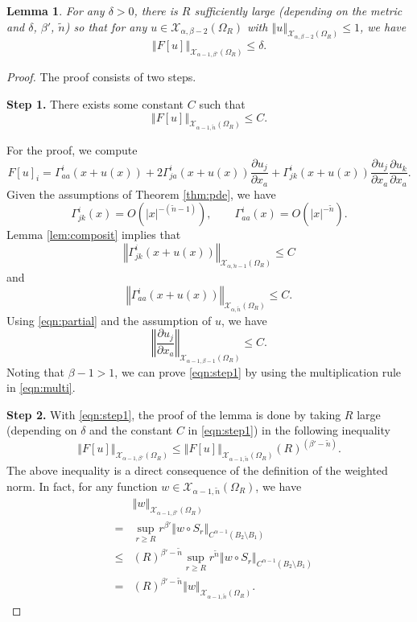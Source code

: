 \documentclass{amsart}
\newtheorem{lem}[thm]{Lemma}
\newcommand{\norm}[1]{\left\Vert#1\right\Vert}
\newcommand{\abs}[1]{\left\vert#1\right\vert}
\newcommand{\pfrac}[2]{\frac{\partial #1}{\partial #2}}
\numberwithin{equation}{section}
\begin{document}
\begin{lem}\label{lem:Fu}
	For any $\delta>0$, there is $R$ sufficiently large (depending on the metric and $\delta$, $\beta'$, $\tilde{n}$) so that for any $u\in \mathcal X_{\alpha,\beta-2}(\Omega_R)$ with $\norm{u}_{\mathcal X_{\alpha,\beta-2}(\Omega_R)}\leq 1$, we have
	\[
		\norm{F[u]}_{\mathcal X_{\alpha-1,\beta'}(\Omega_{R})}\leq \delta.
	\]
\end{lem}
\begin{proof}
	The proof consists of two steps.


	{\bf Step 1.}
	There exists some constant $C$ such that
	\begin{equation}
		\label{eqn:step1}
		\norm{F[u]}_{\mathcal X_{\alpha-1,\tilde{n}}(\Omega_{R})}\leq C.
	\end{equation}

	For the proof, we compute
	\[
		F[u]_i = \Gamma^i_{aa}(x+u(x)) + 2 \Gamma^i_{ja}(x+u(x)) \pfrac{u_j}{x_a}  + \Gamma^i_{jk}(x+u(x)) \pfrac{u_j}{x_a} \pfrac{u_k}{x_a}.
	\]
	Given the assumptions of Theorem \ref{thm:pde}, we have
	\[
		\Gamma^i_{jk}(x) = O(\abs{x}^{-(\tilde{n}-1)}), \qquad \Gamma^i_{aa}(x) = O(\abs{x}^{-\tilde{n}}).
	\]
	Lemma \ref{lem:composit} implies that
	\[
		\norm{\Gamma^i_{jk}(x+u(x)) }_{\mathcal X_{\alpha,\tilde{n}-1}(\Omega_R)}\leq C
	\]
	and
	\[
		\norm{\Gamma^i_{aa}(x+u(x))}_{\mathcal X_{\alpha,\tilde{n}}(\Omega_R)}\leq C.
	\]
	Using \eqref{eqn:partial} and the assumption of $u$, we have
	\[
		\norm{\pfrac{u_j}{x_a}}_{\mathcal X_{\alpha-1,\beta-1}(\Omega_R)}\leq C.
	\]
	Noting that $\beta-1>1$, we can prove \eqref{eqn:step1} by using the multiplication rule in \eqref{eqn:multi}.


	{\bf Step 2.}
	With \eqref{eqn:step1}, the proof of the lemma is done by taking $R$ large (depending on $\delta$ and the constant $C$ in \eqref{eqn:step1}) in the following inequality
	\begin{equation*}
		\norm{F[u]}_{\mathcal X_{\alpha-1,\beta'}(\Omega_{R})}\leq \norm{F[u]}_{\mathcal X_{\alpha-1,\tilde{n}}(\Omega_{R})} (R)^{(\beta'-\tilde{n})}.
	\end{equation*}
	The above inequality is a direct consequence of the definition of the weighted norm. In fact, for any function $w\in \mathcal X_{\alpha-1,\tilde{n}}(\Omega_{R})$, we have
	\begin{eqnarray*}
		&& \norm{w}_{\mathcal X_{\alpha-1,\beta'}(\Omega_{R})} \\
		&=&\sup_{r\geq R} r^{\beta'} \norm{w\circ S_r}_{C^{\alpha-1}(B_2\setminus B_1)} \\
		&\leq& (R)^{\beta'-\tilde{n}}\sup_{r\geq R} r^{\tilde{n}} \norm{w\circ S_r}_{C^{\alpha-1}(B_2\setminus B_1)} \\
		&=& (R)^{\beta'-\tilde{n}} \norm{w}_{\mathcal X_{\alpha-1,\tilde{n}}(\Omega_R)}.
	\end{eqnarray*}
\end{proof}
\end{document}
